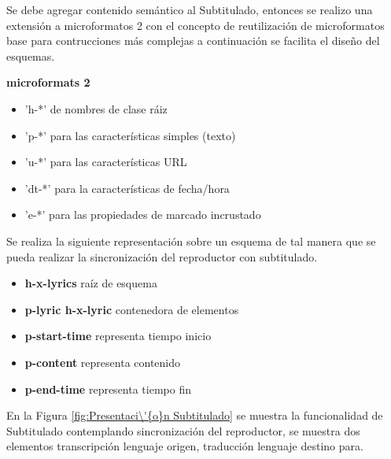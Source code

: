 \begin{minipage}{1.0\textwidth}
	\centering
	\label{fig:Presentaci\'{o}n Glosario}
\end{minipage}

Se debe agregar contenido sem\'{a}ntico al Subtitulado, entonces se realizo una
extensi\'{o}n a microformatos 2 con el concepto de reutilizaci\'{o}n de 
microformatos base para contrucciones m\'{a}s complejas a continuaci\'{o}n se 
facilita el dise\~{n}o del esquemas. \cite{microformats2}

\textbf{microformats 2}

\begin{itemize}

\item 'h-*' de nombres de clase r\'{a}iz
\item 'p-*' para las caracter\'{i}sticas simples (texto)
\item 'u-*' para las caracter\'{i}sticas URL
\item 'dt-*' para la caracter\'{i}sticas de fecha/hora
\item 'e-*' para las propiedades de marcado incrustado
 
\end{itemize}

Se realiza la siguiente representaci\'{o}n sobre un esquema de tal manera que 
se pueda realizar la sincronizaci\'{o}n del reproductor con subtitulado.

\begin{itemize}

\item \textbf{h-x-lyrics} ra\'{i}z de esquema
\item \textbf{p-lyric h-x-lyric} contenedora de elementos
\item \textbf{p-start-time} representa tiempo inicio
\item \textbf{p-content} representa contenido
\item \textbf{p-end-time} representa tiempo fin

\end{itemize}


En la Figura \ref{fig:Presentaci\'{o}n Subtitulado} se muestra la funcionalidad
de Subtitulado contemplando sincronizaci\'{o}n del reproductor, se muestra dos 
elementos transcripci\'{o}n lenguaje origen, traducci\'{o}n lenguaje destino para. 

